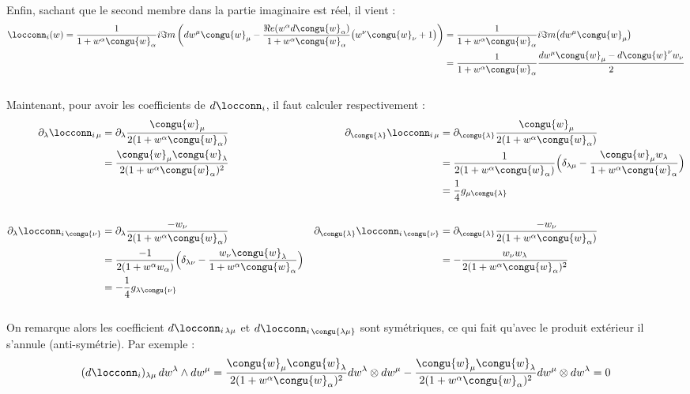 \\
Enfin, sachant que le second membre dans la partie imaginaire est réel, il vient :
\begin{align*}
	\locconn_i(w) = \frac{1}{1 + w^\alpha\congu{w}_\alpha} i\Im m \left( dw^\mu\congu{w}_\mu -  \frac{\Re e(w^\alpha d\congu{w}_\alpha)}{1 + w^\alpha\congu{w}_\alpha}\big( w^\nu\congu{w}_\nu +1 \big) \right) 
	&= \frac{1}{1 + w^\alpha\congu{w}_\alpha} i\Im m \big( dw^\mu\congu{w}_\mu \big) \\
	&= \frac{1}{1 + w^\alpha\congu{w}_\alpha} \frac{dw^\mu\congu{w}_\mu -  d\congu{w}^\nu w_\nu }{2}
\end{align*}
\\

Maintenant, pour avoir les coefficients de $d\locconn_i$, il faut calculer respectivement :
\begin{align*}
	\partial_\lambda \locconn_{i\, \mu} &= \partial_\lambda \frac{\congu{w}_\mu}{2(1 + w^\alpha\congu{w}_\alpha)}  &  
		\partial_{\congu{\lambda}} \locconn_{i\, \mu} &= \partial_{\congu{\lambda}} \frac{\congu{w}_\mu}{2(1 + w^\alpha\congu{w}_\alpha)}
	\\
	&= \frac{\congu{w}_\mu\congu{w}_\lambda}{2(1 + w^\alpha\congu{w}_\alpha)^2}  &  
		&=  \frac{1}{2(1 + w^\alpha\congu{w}_\alpha)} \Big( \delta_{\lambda\mu} - \frac{\congu{w}_\mu w_\lambda}{1 + w^\alpha\congu{w}_\alpha}\Big) \\
	& &  &= \frac{1}{4} g_{\mu \congu{\lambda}}
	\\ \\
	\partial_\lambda \locconn_{i\, \congu{\nu}} &= \partial_{\lambda} \frac{ -w_\nu}{2(1 + w^\alpha\congu{w}_\alpha)}  &  
		\partial_{\congu{\lambda}} \locconn_{i\, \congu{\nu}} &= \partial_{\congu{\lambda}} \frac{ -w_\nu}{2(1 + w^\alpha\congu{w}_\alpha)}
	\\
	&=  \frac{-1}{2(1 + w^\alpha w_\alpha)} \Big( \delta_{\lambda\nu} - \frac{ w_\nu \congu{w}_\lambda}{1 + w^\alpha\congu{w}_\alpha}\Big)  &
		&= -\frac{ w_\nu w_\lambda}{2(1 + w^\alpha\congu{w}_\alpha)^2} \\
	&= -\frac{1}{4} g_{\lambda \congu{\nu}}
\end{align*}
\\
On remarque alors les coefficient $d\locconn_{i\, \lambda \mu}$ et $d\locconn_{i\, \congu{\lambda \mu}}$ sont symétriques, ce qui fait qu'avec le produit extérieur il s'annule (anti-symétrie). Par exemple :
\[(d\locconn_i)_{\lambda \mu}\, dw^\lambda \wedge dw^\mu = \frac{\congu{w}_\mu\congu{w}_\lambda}{2(1 + w^\alpha\congu{w}_\alpha)^2} dw^\lambda \otimes dw^\mu - \frac{\congu{w}_\mu\congu{w}_\lambda}{2(1 + w^\alpha\congu{w}_\alpha)^2} dw^\mu \otimes dw^\lambda = 0\]
